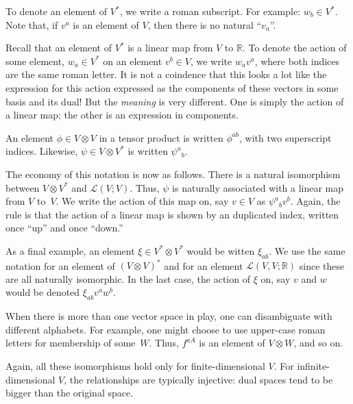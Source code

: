 \documentclass[10pt, a4paper, twocolumn]{article}
\newcommand{\R}{\mathbb{R}}
\begin{document}
To denote an element of $V^*$, we write a roman subscript. For example: $w_b\in
V^*$. Note that, if $v^a$ is an element of $V$, then there is no natural
“$v_a$”.

Recall that an element of $V^*$ is a linear map from $V$ to $\R$. To denote the
action of some element, $w_a\in V^*$ on an element $v^b\in V$, we write $w_a v^a$,
where both indices are the same roman letter. It is not a coindence that this
looks a lot like the expression for this action expressed as the components of
these vectors in some basis and its dual! But the \emph{meaning} is very
different. One is simply the action of a linear map; the other is an expression
in components.

An element $\phi \in V\otimes V$ in a tensor product is written $\phi^{ab}$, with two
superscript indices. Likewise, $\psi \in V \otimes V^*$ is written $\psi^a{}_b$.

The economy of this notation is now as follows. There is a natural isomorphism
between $V\otimes V^*$ and $\mathcal{L}(V; V)$. Thus, $\psi$ is naturally associated with
a linear map from $V$ to~$V$. We write the action of this map on, say $v\in V$ as
$\psi^a{}_b v^b$. Again, the rule is that the action of a linear map is shown by
an duplicated index, written once “up” and once “down.”

As a final example, an element $\xi\in V^*\otimes V^*$ would be witten $\xi_{ab}$. We use
the same notation for an element of $(V\otimes V)^*$ and for an element
$\mathcal{L}(V,V;\R)$ since these are all naturally isomorphic. In the last
case, the action of $\xi$ on, say $v$ and $w$ would be denoted $\xi_{ab}v^a w^b$.

When there is more than one vector space in play, one can disambiguate with
different alphabets. For example, one might choose to use upper-case roman
letters for membership of some~$W$. Thus, $f^{aA}$ is an element of $V\otimes W$, and
so on. 

Again, all these isomorphisms hold only for finite-dimensional $V$. For
infinite-dimensional $V$, the relationships are typically injective: dual spaces
tend to be bigger than the original space.
\end{document}
